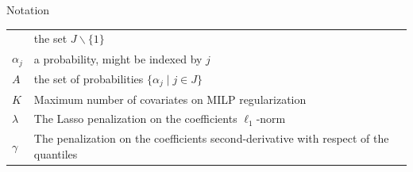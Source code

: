 \documentclass[11pt]{beamer}
\begin{document}
\begin{frame}{Notation}
\begin{longtable}[]{@{}ll@{}}
\begin{minipage}[t]{0.14\columnwidth}
\end{minipage} & \begin{minipage}[t]{0.80\columnwidth}\raggedright\strut
the set \(J\backslash \{1\}\)\strut
\end{minipage}\tabularnewline
\begin{minipage}[t]{0.14\columnwidth}\raggedright\strut
\(\alpha_j\)\strut
\end{minipage} & \begin{minipage}[t]{0.80\columnwidth}\raggedright\strut
a probability, might be indexed by \(j\)\strut
\end{minipage}\tabularnewline
\begin{minipage}[t]{0.14\columnwidth}\raggedright\strut
\(A\)\strut
\end{minipage} & \begin{minipage}[t]{0.80\columnwidth}\raggedright\strut
the set of probabilities \(\{\alpha_j \mid j \in J\}\)\strut
\end{minipage}\tabularnewline
\begin{minipage}[t]{0.14\columnwidth}\raggedright\strut
\(K\)\strut
\end{minipage} & \begin{minipage}[t]{0.80\columnwidth}\raggedright\strut
Maximum number of covariates on MILP regularization\strut
\end{minipage}\tabularnewline
\begin{minipage}[t]{0.14\columnwidth}\raggedright\strut
\(\lambda\)\strut
\end{minipage} & \begin{minipage}[t]{0.80\columnwidth}\raggedright\strut
The Lasso penalization on the coefficients \(\ell_1\)-norm\strut
\end{minipage}\tabularnewline
\begin{minipage}[t]{0.14\columnwidth}\raggedright\strut
\(\gamma\)\strut
\end{minipage} & \begin{minipage}[t]{0.80\columnwidth}\raggedright\strut
The penalization on the coefficients second-derivative with respect of
the quantiles\strut
\end{minipage}\tabularnewline
\bottomrule
\end{longtable}

\end{frame}
\end{document}
